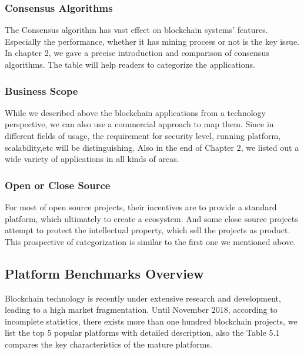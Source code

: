 \subsubsection{Consensus Algorithms}
The Consensus algorithm has vast effect on blockchain systems' features. Especially the performance, whether it has mining process or not is the key issue. In chapter 2, we gave a precise introduction and comparison of consensus algorithms. The table will help readers to categorize the applications. 

\subsubsection{Business Scope}
While we described above the blockchain applications from a technology perspective, we can also use a commercial approach to map them. Since in different fields of usage, the requirement for security level, running platform, scalability,etc will be distinguishing. Also in the end of Chapter 2, we listed out a wide variety of applications in all kinds of areas.
\subsubsection{Open or Close Source}
For most of open source projects, their incentives are to provide a standard platform, which ultimately to create a ecosystem. And some close source projects attempt to protect the intellectual property, which sell the projects as product. This prospective of categorization is similar to the first one we mentioned above.
\subsection{Platform Benchmarks Overview}
Blockchain technology is recently under extensive research and development,
leading to a high market fragmentation. Until November 2018, according to incomplete statistics, there exists more than one hundred blockchain projects\cite{platforms}, we list the top 5 popular platforms with detailed description, also the Table 5.1 compares the key characteristics of the mature platforms. 

